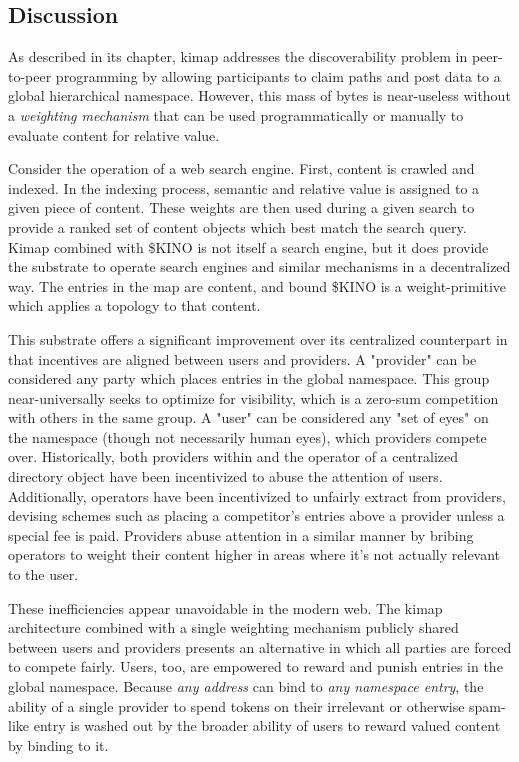 \documentclass[runningheads]{llncs}
\begin{document}
\subsection{Discussion}

As described in its chapter, kimap addresses the discoverability problem in peer-to-peer programming by allowing participants to claim paths and post data to a global hierarchical namespace.
However, this mass of bytes is near-useless without a \textit{weighting mechanism} that can be used programmatically or manually to evaluate content for relative value.

Consider the operation of a web search engine.
First, content is crawled and indexed.
In the indexing process, semantic and relative value is assigned to a given piece of content.
These weights are then used during a given search to provide a ranked set of content objects which best match the search query.
Kimap combined with \$KINO is not itself a search engine, but it does provide the substrate to operate search engines and similar mechanisms in a decentralized way.
The entries in the map are content, and bound \$KINO is a weight-primitive which applies a topology to that content.

This substrate offers a significant improvement over its centralized counterpart in that incentives are aligned between users and providers.
A "provider" can be considered any party which places entries in the global namespace.
This group near-universally seeks to optimize for visibility, which is a zero-sum competition with others in the same group.
A "user" can be considered any "set of eyes" on the namespace (though not necessarily human eyes), which providers compete over.
Historically, both providers within and the operator of a centralized directory object have been incentivized to abuse the attention of users.
Additionally, operators have been incentivized to unfairly extract from providers, devising schemes such as placing a competitor's entries above a provider unless a special fee is paid.
Providers abuse attention in a similar manner by bribing operators to weight their content higher in areas where it's not actually relevant to the user.

These inefficiencies appear unavoidable in the modern web.
The kimap architecture combined with a single weighting mechanism publicly shared between users and providers presents an alternative in which all parties are forced to compete fairly.
Users, too, are empowered to reward and punish entries in the global namespace.
Because \textit{any address} can bind to \textit{any namespace entry}, the ability of a single provider to spend tokens on their irrelevant or otherwise spam-like entry is washed out by the broader ability of users to reward valued content by binding to it.
\end{document}
